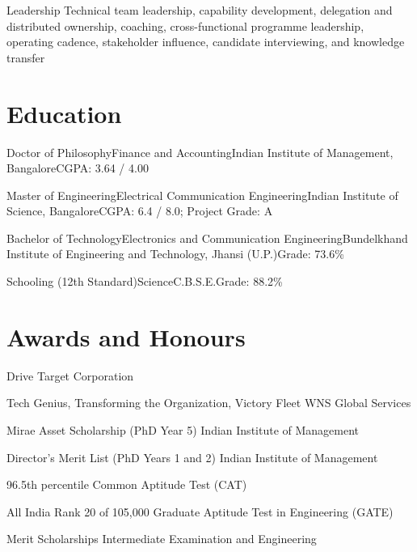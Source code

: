 \documentclass[11pt,a4paper]{moderncv}
\begin{document}
    {Leadership}
    {Technical team leadership, capability development, delegation and distributed ownership, coaching, cross-functional programme leadership, operating cadence, stakeholder influence, candidate interviewing, and knowledge transfer}
    {}{}{}

\hypertarget{education}{
\section{Education}\label{education}}

\nopagebreak
    {Doctor of Philosophy}{Finance and Accounting}{Indian Institute of Management, Bangalore}{}{CGPA: 3.64 / 4.00}

    {Master of Engineering}{Electrical Communication Engineering}{Indian Institute of Science, Bangalore}{}{CGPA: 6.4 / 8.0; Project Grade: A}

    {Bachelor of Technology}{Electronics and Communication Engineering}{Bundelkhand Institute of Engineering and Technology, Jhansi (U.P.)}{}{Grade: 73.6\%}

    {Schooling (12th Standard)}{Science}{C.B.S.E.}{}{Grade: 88.2\%}

\hypertarget{awards-and-honours}{
\section{Awards and Honours}\label{awards-and-honours}}

\nopagebreak
    {Drive}
    {Target Corporation}{}{}{}

    {Tech Genius, Transforming the Organization, Victory Fleet}
    {WNS Global Services}{}{}{}

    {Mirae Asset Scholarship (PhD Year 5)}
    {Indian Institute of Management}{}{}{}

    {Director's Merit List (PhD Years 1 and 2)}
    {Indian Institute of Management}{}{}{}

    {96.5th percentile}
    {Common Aptitude Test (CAT)}{}{}{}

    {All India Rank 20 of 105,000}
    {Graduate Aptitude Test in Engineering (GATE)}{}{}{}

    {Merit Scholarships}
    {Intermediate Examination and Engineering}{}{}{}
\end{document}
